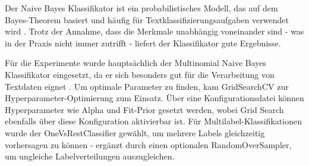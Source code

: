 Der Naive Bayes Klassifikator ist ein probabilistisches Modell, das auf dem Bayes-Theorem basiert und häufig für Textklassifizierungsaufgaben verwendet wird \cite{maron_1961}. Trotz der Annahme, dass die Merkmale unabhängig voneinander sind - was in der Praxis nicht immer zutrifft - liefert der Klassifikator gute Ergebnisse.

Für die Experimente wurde hauptsächlich der Multinomial Naive Bayes Klassifikator eingesetzt, da er sich besonders gut für die Verarbeitung von Textdaten eignet \cite{eyheramendy_2003}. Um optimale Parameter zu finden, kam GridSearchCV zur Hyperparameter-Optimierung zum Einsatz. Über eine Konfigurationsdatei können Hyperparameter wie Alpha und Fit-Prior gesetzt werden, wobei Grid Search ebenfalls über diese Konfiguration aktivierbar ist. Für Multilabel-Klassifikationen wurde der OneVsRestClassifier gewählt, um mehrere Labels gleichzeitig vorhersagen zu können - ergänzt durch einen optionalen RandomOverSampler, um ungleiche Labelverteilungen auszugleichen.

